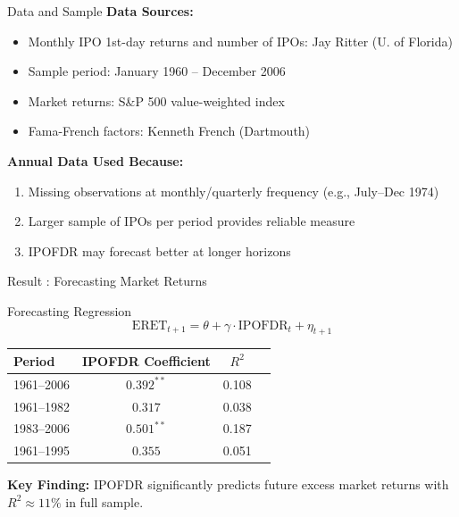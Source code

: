 \documentclass{beamer}
\begin{document}
\begin{frame}{Data and Sample}
\textbf{Data Sources:}
\begin{itemize}
    \item Monthly IPO 1st-day returns and number of IPOs: Jay Ritter (U. of Florida)
    \item Sample period: January 1960 -- December 2006
    \item Market returns: S\&P 500 value-weighted index
    \item Fama-French factors: Kenneth French (Dartmouth)
\end{itemize}

\textbf{Annual Data Used Because:}
\begin{enumerate}
    \item Missing observations at monthly/quarterly frequency (e.g., July--Dec 1974)
    \item Larger sample of IPOs per period provides reliable measure
    \item IPOFDR may forecast better at longer horizons
\end{enumerate}
\end{frame}

\begin{frame}{Result : Forecasting Market Returns}
\begin{block}{Forecasting Regression}
\[
\text{ERET}_{t+1} = \theta + \gamma \cdot \text{IPOFDR}_t + \eta_{t+1}
\]
\end{block}

\begin{table}[h]
\centering
\small
\begin{tabular}{lccc}
\toprule
Period & IPOFDR Coefficient & $R^2$ \\
\midrule
1961--2006 & $0.392^{**}$ & 0.108 \\
1961--1982 & $0.317$ & 0.038 \\
1983--2006 & $0.501^{**}$ & 0.187 \\
1961--1995 & $0.355$ & 0.051 \\
\bottomrule
\end{tabular}
\end{table}

\textbf{Key Finding:} IPOFDR significantly predicts future excess market returns with $R^2 \approx 11\%$ in full sample.
\end{frame}
\end{document}
